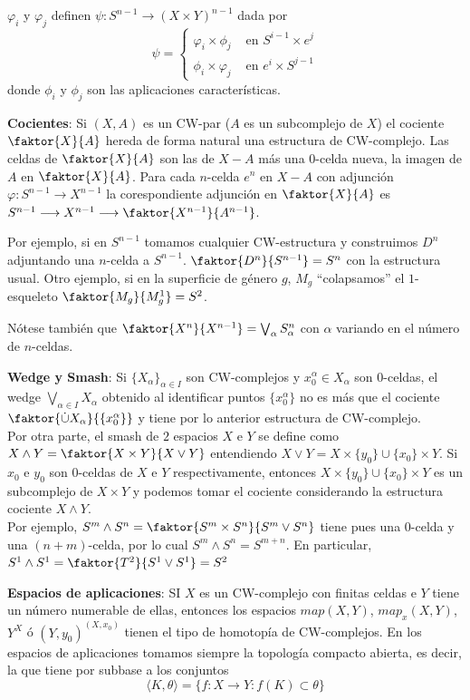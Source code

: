 $\varphi_i$ y $\varphi_j$ definen $\psi : S^{n-1} \longrightarrow (X \times Y)^{n-1}$ dada por 
\[ \psi = \begin{cases}
\varphi_i  \times \phi_j & \text{ en } S^{i-1} \times e^j \\
\phi_i \times \varphi_j & \text{ en } e^i \times S^{j-1}
\end{cases} \]
donde $\phi_i$ y $\phi_j$ son las aplicaciones características. \par 
\textbf{Cocientes}: Si $(X, A)$ es un CW-par ($A$ es un subcomplejo de $X$) el cociente $\faktor{X}{A}$ hereda de forma natural una estructura de CW-complejo. Las celdas de $\faktor{X}{A}$ son las de $X - A$ más una $0$-celda nueva, la imagen de $A$ en $\faktor{X}{A}$. Para cada $n$-celda $e^n$ en $X - A$ con adjunción $\varphi : S^{n-1} \longrightarrow X^{n-1}$ la corespondiente adjunción en $\faktor{X}{A}$ es $S^{n-1} \longrightarrow X^{n-1} \longrightarrow \faktor{X^{n-1}}{A^{n-1}}$. \par
Por ejemplo, si en $S^{n-1}$ tomamos cualquier CW-estructura y construimos $D^n$ adjuntando una $n$-celda a $S^{n-1}$. $\faktor{D^n}{S^{n-1}} = S^n$ con la estructura usual. Otro ejemplo, si en la superficie de género $g$, $M_g$ ``colapsamos'' el $1$-esqueleto $\faktor{M_g}{M_g^1} = S^2$. \par 
Nótese también que $\faktor{X^n}{X^{n-1}} = \bigvee_\alpha S_\alpha^n$ con $\alpha$ variando en el número de $n$-celdas. \par 
\textbf{Wedge y Smash}: Si $\{X_\alpha \}_{\alpha \in I}$ son CW-complejos y $x_0^\alpha \in X_\alpha$  son $0$-celdas, el wedge $\bigvee_{\alpha \in I} X_\alpha$ obtenido al identificar puntos $\{x_0^\alpha \}$ no es más que el cociente $\faktor{\dot{\cup} X_\alpha}{\{x_0^\alpha\}}$ y tiene por lo anterior estructura de CW-complejo. \\
Por otra parte, el smash de $2$ espacios $X$ e $Y$  se define como $X \wedge Y = \faktor{X \times Y}{X \vee Y}$ entendiendo $X \vee Y = X \times \{y_0\} \cup \{x_0\} \times Y$. Si $x_0$ e $y_0$ son $0$-celdas de $X$ e $Y$ respectivamente, entonces $X \times \{y_0\} \cup \{x_0\} \times Y$ es un subcomplejo de $X \times Y$ y podemos tomar el cociente considerando la estructura cociente $X \wedge Y$. \\
Por ejemplo, $S^m \wedge S^n = \faktor{S^m \times S^n}{S^m \vee S^n}$ tiene pues una $0$-celda y una $(n+m)$-celda, por lo cual $S^m \wedge S^n = S^{m+n}$. En particular, $S^1 \wedge S^1 = \faktor{T^2}{S^1 \vee S^1} = S^2$  \par 
\textbf{Espacios de aplicaciones}: SI $X$ es un CW-complejo con finitas celdas e $Y$ tiene un número numerable de ellas, entonces los espacios
$map(X,Y)$, $map_x(X,Y)$, $Y^X$ ó $(Y, y_0)^{(X, x_0)}$ tienen el tipo de homotopía de CW-complejos. En los espacios de aplicaciones tomamos siempre la topología compacto abierta, es decir, la que tiene por subbase a los conjuntos 
\[ \langle K, \theta \rangle = \{f:X \longrightarrow Y : f(K) \subset \theta \} \]
